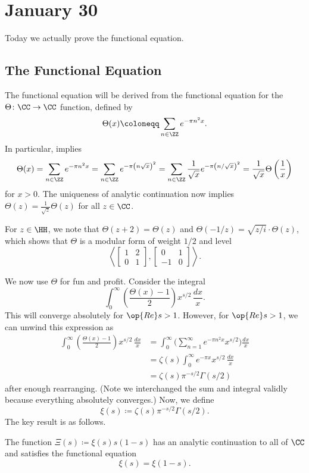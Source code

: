 \documentclass[../notes.tex]{subfiles}
\begin{document}
\section{January 30}

Today we actually prove the functional equation.

\subsection{The Functional Equation}
The functional equation will be derived from the functional equation for the $\Theta\colon\CC\to\CC$ function, defined by
\[\Theta(x)\coloneqq\sum_{n\in\ZZ}e^{-\pi n^2x}.\]
In particular,  implies
\[\Theta(x)=\sum_{n\in\ZZ}e^{-\pi n^2x}=\sum_{n\in\ZZ}e^{-\pi\left(n\sqrt x\right)^2}=\sum_{n\in\ZZ}\frac1{\sqrt x}e^{-\pi\left(n/\sqrt x\right)^2}=\frac1{\sqrt x}\Theta\left(\frac1x\right)\]
for $x>0$. The uniqueness of analytic continuation now implies $\Theta(z)=\frac1{\sqrt z}\Theta(z)$ for all $z\in\CC$.
\begin{remark}
	For $z\in\HH$, we note that $\Theta(z+2)=\Theta(z)$ and $\Theta(-1/z)=\sqrt{z/i}\cdot\Theta(z)$, which shows that $\Theta$ is a modular form of weight $1/2$ and level
	\[\left\langle\begin{bmatrix}
		1 & 2 \\
		0 & 1
	\end{bmatrix},\begin{bmatrix}
		0 & 1 \\
		-1 & 0
	\end{bmatrix}\right\rangle.\]
\end{remark}
We now use $\Theta$ for fun and profit. Consider the integral
\[\int_0^\infty\left(\frac{\Theta(x)-1}2\right)x^{s/2}\,\frac{dx}x.\]
This will converge absolutely for $\op{Re}s>1$. However, for $\op{Re}s>1$, we can unwind this expression as
\begin{align*}
	\int_0^\infty\left(\frac{\Theta(x)-1}2\right)x^{s/2}\,\frac{dx}x &= \int_0^\infty\Bigg(\sum_{n=1}^\infty e^{-\pi n^2x}x^{s/2}\Bigg)\frac{dx}x \\
	&= \zeta(s)\int_0^\infty e^{-\pi x}x^{s/2}\,\frac{dx}x \\
	&= \zeta(s)\pi^{-s/2}\Gamma(s/2)
\end{align*}
after enough rearranging. (Note we interchanged the sum and integral validly because everything absolutely converges.) Now, we define
\[\xi(s)\coloneqq\zeta(s)\pi^{-s/2}\Gamma(s/2).\]
The key result is as follows.
\begin{theorem}
	The function $\Xi(s)\coloneqq\xi(s)s(1-s)$ has an analytic continuation to all of $\CC$ and satisfies the functional equation
	\[\xi(s)=\xi(1-s).\]
\end{theorem}
\end{document}
